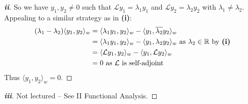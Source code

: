 \documentclass[../main.tex]{subfiles}
\begin{document}
\begin{proof}[\textbf{ii}]
  So we have $y_1, y_2 \neq 0$ such that $\mathcal{L}y_1 = \lambda_1 y_1$ and $\mathcal{L}y_2 = \lambda_2 y_2$ with $\lambda_1 \neq \lambda_2$.
  Appealing to a similar strategy as in \textbf{(i)}:
  \begin{align*}
    (\lambda_1 - \lambda_2) \langle y_1, y_2 \rangle_{w} &= \langle \lambda_1 y_1, y_2 \rangle_{w} - \langle y_1, \overline{\lambda_2} y_2 \rangle_{w} \\
                                                         &= \langle \lambda_1 y_1, y_2 \rangle_{w} - \langle y_1, \lambda_2 y_2 \rangle_{w} \text{ as $\lambda_2 \in \mathbb{R}$ by \textbf{(i)}} \\
                                                         &= \langle \mathcal{L} y_1, y_2 \rangle_{w} - \langle y_1, \mathcal{L} y_2 \rangle_{w} \\
                                                         &= 0 \text{ as $\mathcal{L}$ is self-adjoint}
  \end{align*}
  Thus $\langle y_1, y_2 \rangle_{w} = 0$.
\end{proof}
\begin{proof}[\textbf{iii}]
  Not lectured -- See II Functional Analysis.
\end{proof}
\end{document}
